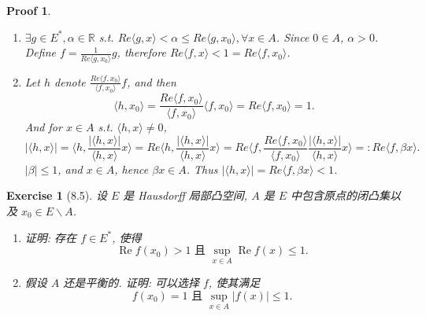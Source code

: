 \documentclass[hyperref,UTF8]{ctexart}
\newtheorem{ex}{Exercise}[section]
\newtheorem{pf}{Proof}[section]
\begin{document}
\begin{pf}
\begin{enumerate}
    \item $\exists g\in E^*, \alpha \in \mathbb R$ s.t. $Re \langle g, x\rangle  < \alpha \leq Re \langle g, x_0\rangle, \forall x\in A$. Since $0\in A$, $\alpha >0$. Define $f = \frac1{Re\langle g, x_0\rangle}g$, therefore $Re \langle f, x\rangle  < 1 = Re\langle f, x_0\rangle$.
    \item Let $h$ denote $\frac{Re \langle f, x_0\rangle}{\langle f, x_0\rangle}f$, and then
    \[
        \langle h, x_0\rangle = \frac{Re \langle f, x_0\rangle}{\langle f, x_0\rangle}\langle f, x_0\rangle = Re \langle f, x_0\rangle = 1. 
    \]
    And for $x\in A$ s.t. $\langle h, x\rangle \neq 0$, 
    \[
        |\langle h, x\rangle| = 
        \langle h, \frac{|\langle h, x\rangle|}{\langle h, x\rangle}x\rangle = Re\langle h, \frac{|\langle h, x\rangle|}{\langle h, x\rangle}x\rangle = 
        Re\langle f, \frac{Re \langle f, x_0\rangle}{\langle f, x_0\rangle}\frac{|\langle h, x\rangle|}{\langle h, x\rangle}x\rangle=:Re\langle f, \beta x \rangle.
    \]
    $\left|\beta\right|\leq 1$, and $x\in A$, hence $\beta x\in A$. Thus $|\langle h, x\rangle| = Re\langle f,\beta x\rangle < 1$. 
    
\end{enumerate}
\end{pf}\newpage

\begin{ex}[8.5]
    设 $E$ 是 Hausdorff 局部凸空间, $A$ 是 $E$ 中包含原点的闭凸集以及 $x_{0} \in E \backslash A$.
    \begin{enumerate}
        \item 证明: 存在 $f \in E^{*}$, 使得
        $$
        \operatorname{Re} f\left(x_{0}\right)>1 \text { 且 } \sup _{x \in A} \operatorname{Re} f(x) \leqslant 1 \text {. }
        $$
        \item 假设 $A$ 还是平衡的. 证明: 可以选择 $f$, 使其满足
        $$
        f\left(x_{0}\right)=1 \text { 且 } \sup _{x \in A}|f(x)| \leqslant 1 \text {. }
        $$
    \end{enumerate}
\end{ex}
\end{document}
